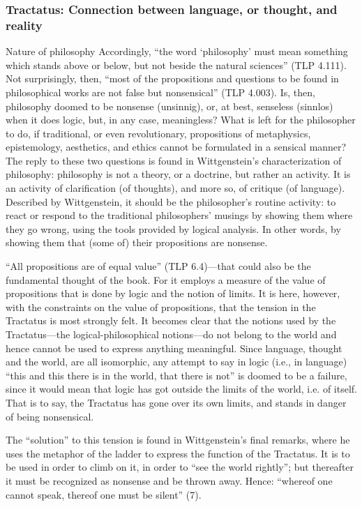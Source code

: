 \documentclass[../main.tex]{subfiles}
\begin{document}
\subsubsection{Tractatus: Connection between language, or thought, and reality}
Nature of philosophy
Accordingly, “the word ‘philosophy’ must mean something which stands above or below, but not beside the natural sciences” (TLP 4.111). Not surprisingly, then, “most of the propositions and questions to be found in philosophical works are not false but nonsensical” (TLP 4.003). Is, then, philosophy doomed to be nonsense (unsinnig), or, at best, senseless (sinnlos) when it does logic, but, in any case, meaningless? What is left for the philosopher to do, if traditional, or even revolutionary, propositions of metaphysics, epistemology, aesthetics, and ethics cannot be formulated in a sensical manner? The reply to these two questions is found in Wittgenstein's characterization of philosophy: philosophy is not a theory, or a doctrine, but rather an activity. It is an activity of clarification (of thoughts), and more so, of critique (of language). Described by Wittgenstein, it should be the philosopher's routine activity: to react or respond to the traditional philosophers' musings by showing them where they go wrong, using the tools provided by logical analysis. In other words, by showing them that (some of) their propositions are nonsense.

“All propositions are of equal value” (TLP 6.4)—that could also be the fundamental thought of the book. For it employs a measure of the value of propositions that is done by logic and the notion of limits. It is here, however, with the constraints on the value of propositions, that the tension in the Tractatus is most strongly felt. It becomes clear that the notions used by the Tractatus—the logical-philosophical notions—do not belong to the world and hence cannot be used to express anything meaningful. Since language, thought and the world, are all isomorphic, any attempt to say in logic (i.e., in language) “this and this there is in the world, that there is not” is doomed to be a failure, since it would mean that logic has got outside the limits of the world, i.e. of itself. That is to say, the Tractatus has gone over its own limits, and stands in danger of being nonsensical.

The “solution” to this tension is found in Wittgenstein's final remarks, where he uses the metaphor of the ladder to express the function of the Tractatus. It is to be used in order to climb on it, in order to “see the world rightly”; but thereafter it must be recognized as nonsense and be thrown away. Hence: “whereof one cannot speak, thereof one must be silent” (7).
\end{document}
